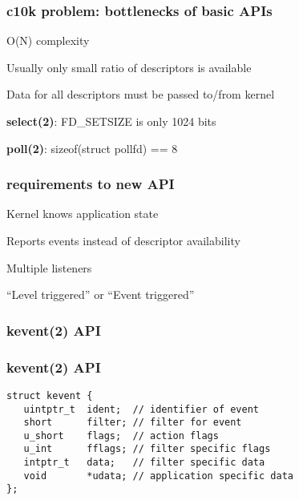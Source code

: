 \documentclass{beamer}
\begin{document}
\FootReferences{}{}
\begin{frame}
\frametitle{c10k problem: bottlenecks of basic APIs}
\begin{itemize}
 {
  \item {O(N) complexity}
}
 {
  \item {Usually only small ratio of descriptors is available}
  \item {Data for all descriptors must be passed to/from kernel}
}
 {
  \item {\textbf{select(2)}: FD\_SETSIZE is only 1024 bits}
}
 {
  \item {\textbf{poll(2)}: sizeof(struct pollfd) == 8}
}
\end{itemize}
\end{frame}


\FootReferences{}{}
\begin{frame}
\frametitle{requirements to new API}
\begin{itemize}
 {
  \item {Kernel knows application state}
}
 {
  \item {Reports events instead of descriptor availability}
}
 {
  \item {Multiple listeners}
}
 {
  \item {``Level triggered'' or ``Event triggered''}
}
\end{itemize}
\end{frame}


\begin{frame}
\frametitle{kevent(2) API}
\end{frame}


\begin{frame}[fragile]
\frametitle{kevent(2) API}
\lstset{language=C}
\begin{lstlisting}
struct kevent {
   uintptr_t  ident;  // identifier of event
   short      filter; // filter for event
   u_short    flags;  // action flags
   u_int      fflags; // filter specific flags
   intptr_t   data;   // filter specific data
   void       *udata; // application specific data
};
\end{lstlisting}
\end{frame}
\end{document}
